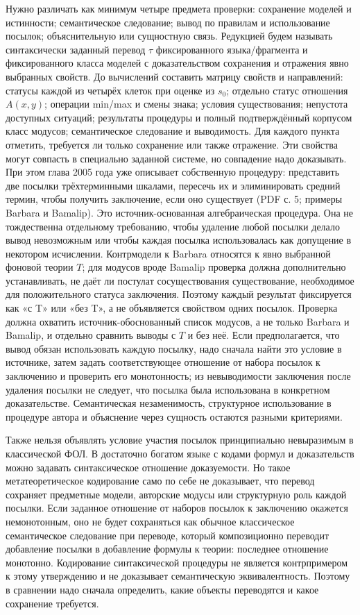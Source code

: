 \documentclass[12pt,a4paper]{article}
\begin{document}
Нужно различать как минимум четыре предмета проверки: сохранение моделей и истинности; семантическое следование; вывод по правилам и использование посылок; объяснительную или сущностную связь. Редукцией будем называть синтаксически заданный перевод \(\tau\) фиксированного языка/фрагмента и фиксированного класса моделей с доказательством сохранения и отражения явно выбранных свойств. До вычислений составить матрицу свойств и направлений: статусы каждой из четырёх клеток при оценке из \(s_0\); отдельно статус отношения \(A(x,y)\); операции min/max и смены знака; условия существования; непустота доступных ситуаций; результаты процедуры и полный подтверждённый корпусом класс модусов; семантическое следование и выводимость. Для каждого пункта отметить, требуется ли только сохранение или также отражение. Эти свойства могут совпасть в специально заданной системе, но совпадение надо доказывать. При этом глава 2005 года уже описывает собственную процедуру: представить две посылки трёхтерминными шкалами, пересечь их и элиминировать средний термин, чтобы получить заключение, если оно существует (PDF с. 5; примеры Barbara и Bamalip). Это источник-основанная алгебраическая процедура. Она не тождественна отдельному требованию, чтобы удаление любой посылки делало вывод невозможным или чтобы каждая посылка использовалась как допущение в некотором исчислении. Контрмодели к Barbara относятся к явно выбранной фоновой теории \(T\); для модусов вроде Bamalip проверка должна дополнительно устанавливать, не даёт ли постулат сосуществования существование, необходимое для положительного статуса заключения. Поэтому каждый результат фиксируется как «с T» или «без T», а не объявляется свойством одних посылок. Проверка должна охватить источник-обоснованный список модусов, а не только Barbara и Bamalip, и отдельно сравнить выводы с \(T\) и без неё. Если предполагается, что вывод обязан использовать каждую посылку, надо сначала найти это условие в источнике, затем задать соответствующее отношение от набора посылок к заключению и проверить его монотонность; из невыводимости заключения после удаления посылки не следует, что посылка была использована в конкретном доказательстве. Семантическая незаменимость, структурное использование в процедуре автора и объяснение через сущность остаются разными критериями.

Также нельзя объявлять условие участия посылок принципиально невыразимым в классической ФОЛ. В достаточно богатом языке с кодами формул и доказательств можно задавать синтаксическое отношение доказуемости. Но такое метатеоретическое кодирование само по себе не доказывает, что перевод сохраняет предметные модели, авторские модусы или структурную роль каждой посылки. Если заданное отношение от наборов посылок к заключению окажется немонотонным, оно не будет сохраняться как обычное классическое семантическое следование при переводе, который композиционно переводит добавление посылки в добавление формулы к теории: последнее отношение монотонно. Кодирование синтаксической процедуры не является контрпримером к этому утверждению и не доказывает семантическую эквивалентность. Поэтому в сравнении надо сначала определить, какие объекты переводятся и какое сохранение требуется.
\end{document}
